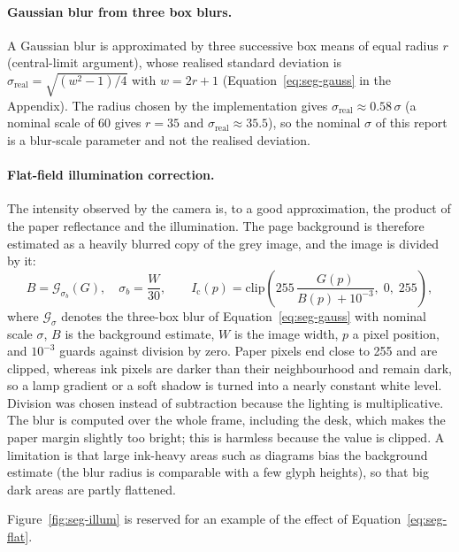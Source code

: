 \paragraph{Gaussian blur from three box blurs.}
A Gaussian blur is approximated by three successive box means of equal radius $r$ (central-limit argument), whose realised standard deviation is $\sigma_{\mathrm{real}}=\sqrt{(w^2-1)/4}$ with $w=2r+1$ (Equation~\ref{eq:seg-gauss} in the Appendix).
The radius chosen by the implementation gives $\sigma_{\mathrm{real}}\approx0.58\,\sigma$ (a nominal scale of 60 gives $r=35$ and $\sigma_{\mathrm{real}}\approx35.5$), so the nominal $\sigma$ of this report is a blur-scale parameter and not the realised deviation.

\paragraph{Flat-field illumination correction.}
The intensity observed by the camera is, to a good approximation, the product of the paper reflectance and the illumination.
The page background is therefore estimated as a heavily blurred copy of the grey image, and the image is divided by it:
\begin{equation}
B=\mathcal{G}_{\sigma_b}(G),\quad \sigma_b=\frac{W}{30},\qquad I_{\mathrm c}(p)=\mathrm{clip}\!\left(255\,\frac{G(p)}{B(p)+10^{-3}},\;0,\;255\right),
\label{eq:seg-flat}
\end{equation}
where $\mathcal G_{\sigma}$ denotes the three-box blur of Equation~\ref{eq:seg-gauss} with nominal scale $\sigma$, $B$ is the background estimate, $W$ is the image width, $p$ a pixel position, and $10^{-3}$ guards against division by zero.
Paper pixels end close to 255 and are clipped, whereas ink pixels are darker than their neighbourhood and remain dark, so a lamp gradient or a soft shadow is turned into a nearly constant white level.
Division was chosen instead of subtraction because the lighting is multiplicative.
The blur is computed over the whole frame, including the desk, which makes the paper margin slightly too bright; this is harmless because the value is clipped.
A limitation is that large ink-heavy areas such as diagrams bias the background estimate (the blur radius is comparable with a few glyph heights), so that big dark areas are partly flattened.

\begin{figure}[h]
\centering
\end{figure}

Figure~\ref{fig:seg-illum} is reserved for an example of the effect of Equation~\ref{eq:seg-flat}.

